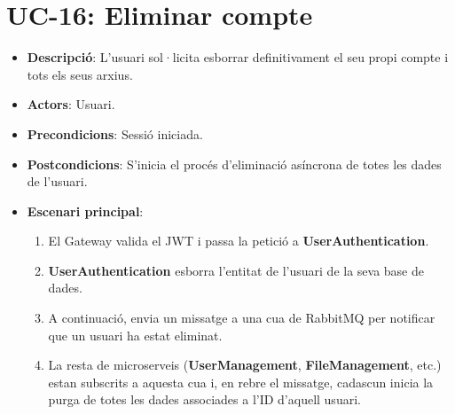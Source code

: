 \section{UC-16: Eliminar compte}
\begin{itemize}
    \item \textbf{Descripció}: L'usuari sol·licita esborrar definitivament el seu propi compte i tots els seus arxius.
    \item \textbf{Actors}: Usuari.
    \item \textbf{Precondicions}: Sessió iniciada.
    \item \textbf{Postcondicions}: S'inicia el procés d'eliminació asíncrona de totes les dades de l'usuari.
    \item \textbf{Escenari principal}:
    \begin{enumerate}
        \item El Gateway valida el JWT i passa la petició a \textbf{UserAuthentication}.
        \item \textbf{UserAuthentication} esborra l'entitat de l'usuari de la seva base de dades.
        \item A continuació, envia un missatge a una cua de RabbitMQ per notificar que un usuari ha estat eliminat.
        \item La resta de microserveis (\textbf{UserManagement}, \textbf{FileManagement}, etc.) estan subscrits a aquesta cua i, en rebre el missatge, cadascun inicia la purga de totes les dades associades a l'ID d'aquell usuari.
    \end{enumerate}
\end{itemize}

